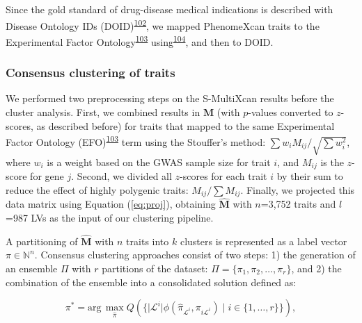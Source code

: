 \documentclass[
  a4paper,
]{article}
\begin{document}
Since the gold standard of drug-disease medical indications is described with Disease Ontology IDs (DOID)\textsuperscript{\protect\hyperlink{ref-1FsruosUW}{102}}, we mapped PhenomeXcan traits to the Experimental Factor Ontology\textsuperscript{\protect\hyperlink{ref-9okjVu3s}{103}} using\textsuperscript{\protect\hyperlink{ref-16RTdMKxI}{104}}, and then to DOID.

\hypertarget{sec:methods:clustering}{%
\subsubsection{Consensus clustering of traits}\label{sec:methods:clustering}}

We performed two preprocessing steps on the S-MultiXcan results before the cluster analysis.
First, we combined results in \(\mathbf{M}\) (with \(p\)-values converted to \(z\)-scores, as described before) for traits that mapped to the same Experimental Factor Ontology (EFO)\textsuperscript{\protect\hyperlink{ref-9okjVu3s}{103}} term using the Stouffer's method: \(\sum w_i M_{ij} / \sqrt{\sum w_i^2}\), where \(w_i\) is a weight based on the GWAS sample size for trait \(i\), and \(M_{ij}\) is the \(z\)-score for gene \(j\).
Second, we divided all \(z\)-scores for each trait \(i\) by their sum to reduce the effect of highly polygenic traits: \(M_{ij} / \sum M_{ij}\).
Finally, we projected this data matrix using Equation (\ref{eq:proj}), obtaining \(\hat{\mathbf{M}}\) with \(n\)=3,752 traits and \(l\)=987 LVs as the input of our clustering pipeline.

A partitioning of \(\hat{\mathbf{M}}\) with \(n\) traits into \(k\) clusters is represented as a label vector \(\pi \in \mathbb{N}^n\).
Consensus clustering approaches consist of two steps:
1) the generation of an ensemble \(\Pi\) with \(r\) partitions of the dataset: \(\Pi=\{\pi_1, \pi_2, \ldots, \pi_r\}\),
and 2) the combination of the ensemble into a consolidated solution defined as:

\begin{equation}
\pi^* = \mathrm{arg}\,\underset{\hat{\pi}}{\max} Q(\{ \lvert \mathcal{L}^i \lvert \phi(\hat{\pi}_{\mathcal{L}^i}, \pi_{i \mathcal{L}^i}) \mid i \in \{1,\ldots,r\} \}),
\label{eq:consensus:obj_func}\end{equation}
\end{document}
